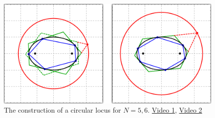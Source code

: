 \begin{figure}[H]
    \centering
        \includegraphics[width=\textwidth]{pics/u0180_circ_grid.pdf}
    \caption{The construction of a circular locus for $N=5,6$.
    \href{https://youtu.be/dINE4aH1cvk}{Video 1},
    \href{https://youtu.be/EFeINGIDFrg}{Video 2} \cite[pl\#20,21]{dsr_math_intell_playlist}}
    \label{fig:gen-circ-grid}
\end{figure}
